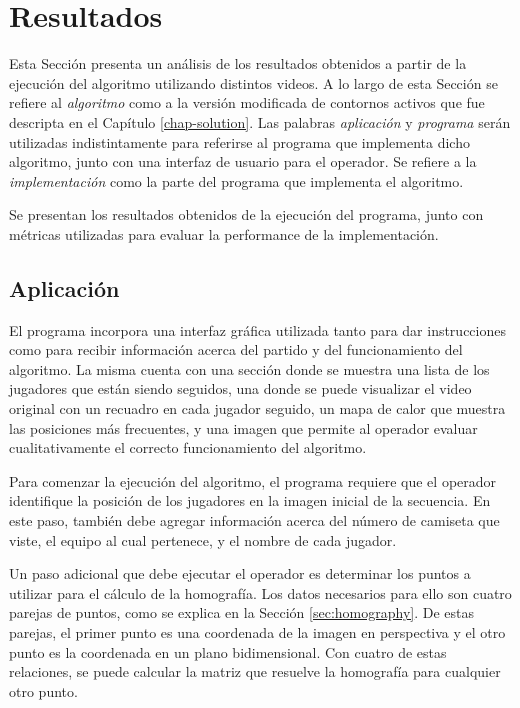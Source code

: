 \chapter{Resultados}
\label{chap-results}

Esta Sección presenta un análisis de los resultados obtenidos a partir de la
ejecución del algoritmo utilizando distintos videos. A lo largo de esta Sección
se refiere al \textit{algoritmo} como a la versión modificada de contornos
activos que fue descripta en el Capítulo \ref{chap-solution}. Las palabras
\textit{aplicación} y \textit{programa} serán utilizadas indistintamente para
referirse al programa que implementa dicho algoritmo, junto con una interfaz de
usuario para el operador. Se refiere a la \textit{implementación} como la
parte del programa que implementa el algoritmo.

Se presentan los resultados obtenidos de la ejecución del programa, junto con
métricas utilizadas para evaluar la performance de la implementación.

\section{Aplicación}

El programa incorpora una interfaz gráfica utilizada tanto para dar
instrucciones como para recibir información acerca del partido y del
funcionamiento del algoritmo. La misma cuenta con una sección donde se muestra
una lista de los jugadores que están siendo seguidos, una donde se puede
visualizar el video original con un recuadro en cada jugador seguido, un mapa de
calor que muestra las posiciones más frecuentes, y una imagen que permite al
operador evaluar cualitativamente el correcto funcionamiento del algoritmo.

Para comenzar la ejecución del algoritmo, el programa requiere que el operador
identifique la posición de los jugadores en la imagen inicial de la secuencia.
En este paso, también debe agregar información acerca del número de camiseta
que viste, el equipo al cual pertenece, y el nombre de cada jugador.

Un paso adicional que debe ejecutar el operador es determinar los puntos a
utilizar para el cálculo de la homografía. Los datos necesarios para ello son
cuatro parejas de puntos, como se explica en la Sección \ref{sec:homography}. De
estas parejas, el primer punto es una coordenada de la imagen en perspectiva y
el otro punto es la coordenada en un plano bidimensional. Con cuatro de estas
relaciones, se puede calcular la matriz que resuelve la homografía para
cualquier otro punto.

